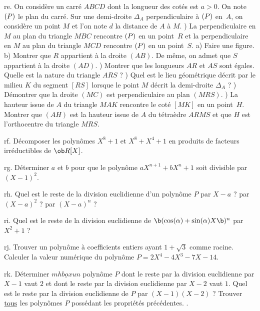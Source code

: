 \exo  [Level=1,Fight=3,Learn=3,Field=\GéométrieSpatiale,Type=\Problèmes,Origin=] re. 
On considère un carré $ABCD$ dont la longueur des cotés est $a>0$. 
On note $(\sc P)$ le plan du carré. Sur une demi-droite $\Delta_A$ perpendiculaire à $(\sc P)$ en~$A$,  
on considère un point $M$ et l'on note $d$ la distance de $A$ à $M$. ) La perpendiculaire en $M$ au plan du triangle $MBC$ rencontre $(\sc P)$ en un point~$R$ et 
la perpendiculaire en $M$ au plan du triangle $MCD$ rencontre $(\sc P)$ en un point~$S$. \pn
a) Faire une figure. \pn
b) Montrer que $R$ appartient à la droite $(AB)$. \pn
De même, on admet que $S$ appartient à la droite $(AD)$. ) Montrer que les longueurs $AR$ et $AS$ sont égales. \smallskip\noindent
Quelle est la nature du triangle $ARS$ ? ) Quel est le lieu géométrique décrit par le milieu $K$ du segment $[RS]$ lorsque le point $M$ 
décrit la demi-droite $\Delta_A$ ? ) Démontrer que la droite $(MC)$ est perpendiculaire au plan $(MRS)$. ) La hauteur issue de $A$ du triangle $MAK$ rencontre le coté $[MK]$ en un point~$H$. 
Montrer que $(AH)$ est la hauteur issue de $A$ du tétraèdre $ARMS$ et que $H$ est l'orthocentre du triangle $MRS$. 

\exo  [Level=1,Fight=1,Learn=1,Field=\Polynômes,Type=\Exercices,Origin=] rf. 
Décomposer les polynômes $X^8+1$ et $X^8+X^4+1$ en produits 
de facteurs irréductibles de $\ob R[X]$. 

\exo  [Level=1,Fight=1,Learn=1,Field=\Polynômes,Type=\Exercices,Origin=] rg. 
Déterminer $a$ et $b$ pour que le polynôme $aX^{n+1}+bX^n+1$ soit divisible par $(X-1)^2$. 

\exo  [Level=1,Fight=1,Learn=1,Field=\Polynômes,Type=\Exercices,Origin=] rh. 
Quel est le reste de la division euclidienne d'un polynôme $P$ par $X-a$ ? par $(X-a)^2$ ? par $(X-a)^n$ ? 

\exo  [Level=1,Fight=1,Learn=1,Field=\Polynômes,Type=\Exercices,Origin=] ri. 
Quel est le reste de la division euclidienne de $\b(\cos(\alpha)+\sin(\alpha)X\b)^n$ 
par $X^2+1$ ? 

\exo  [Level=1,Fight=1,Learn=1,Field=\Polynômes,Type=\Exercices,Origin=] rj. 
Trouver un polynôme à coefficients entiers ayant $1+\sqrt3$ comme racine. Calculer la valeur numérique du polynôme $P=2X^4-4X^3-7X-14$. 

\exo  [Level=1,Fight=1,Learn=1,Field=\Polynômes,Type=\Exercices,Origin=] rk. 
Déterminer $\underline{mhbox{un}}$ polynôme $P$ dont le reste par la division euclidienne par $X-1$ 
vaut $2$ et dont le reste par la division euclidienne par $X-2$ vaut $1$. Quel est le reste par la division euclidienne de $P$ par $(X-1)(X-2)$ ?  
Trouver $\underline{\hbox{tous}}$ les polynômes $P$ possédant les propriétés précédentes. . 

